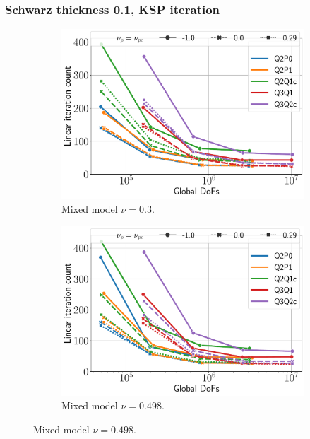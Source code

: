 \documentclass{beamer}
\begin{document}
\begin{frame}
	\frametitle{Schwarz thickness 0.1, KSP iteration}
	\begin{figure}[H]
		\begin{subfigure}{.5\textwidth}
			\centering
			\includegraphics[width=.8\textwidth]{../figs/KSPiter-schwarz2-mixed-0.3.pdf}
			\caption{Mixed model $\nu = 0.3$.}
		\end{subfigure}%
		\begin{subfigure}{.5\textwidth}
			\centering
			\includegraphics[width=.8\textwidth]{../figs/KSPiter-schwarz2-mixed-0.498.pdf}
			\caption{Mixed model $\nu = 0.498$.}
		\end{subfigure}
	\end{figure}
\end{frame}
\end{document}
